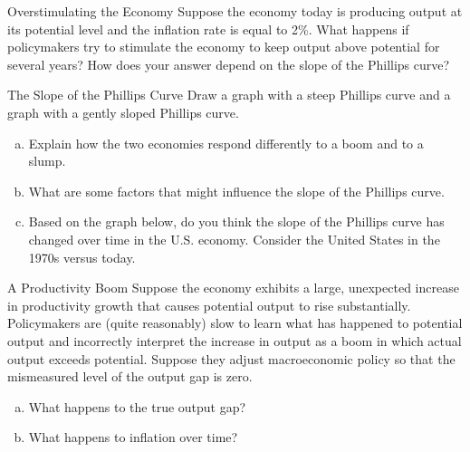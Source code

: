 \documentclass[8pt]{extarticle}
\title{}
\author{Avinash Iyer}
\date{}
\begin{document}
  \begin{problem}{Overstimulating the Economy}
    Suppose the economy today is producing output at its potential level and the inflation rate is equal to 2\%. What happens if policymakers try to stimulate the economy to keep output above potential for several years? How does your answer depend on the slope of the Phillips curve?
  \end{problem}
  \begin{problem}{The Slope of the Phillips Curve}
    Draw a graph with a steep Phillips curve and a graph with a gently sloped Phillips curve.
    \begin{enumerate}[(a)]
      \item Explain how the two economies respond differently to a boom and to a slump.
      \item What are some factors that might influence the slope of the Phillips curve.
      \item Based on the graph below, do you think the slope of the Phillips curve has changed over time in the U.S. economy. Consider the United States in the 1970s versus today.
    \end{enumerate}
  \end{problem}
  \begin{problem}{A Productivity Boom}
    Suppose the economy exhibits a large, unexpected increase in productivity growth that causes potential output to rise substantially. Policymakers are (quite reasonably) slow to learn what has happened to potential output and incorrectly interpret the increase in output as a boom in which actual output exceeds potential. Suppose they adjust macroeconomic policy so that the mismeasured level of the output gap is zero.
    \begin{enumerate}[(a)]
      \item What happens to the true output gap?
      \item What happens to inflation over time?
    \end{enumerate}
  \end{problem}
\end{document}
